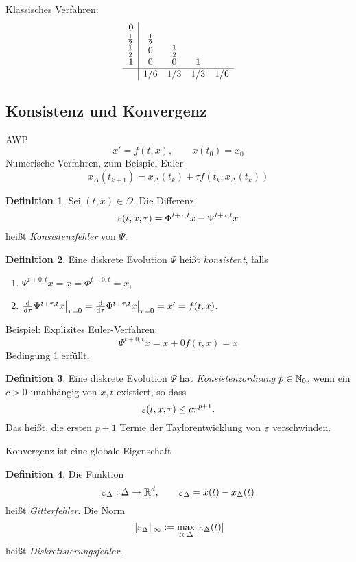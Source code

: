 \documentclass[
 a4paper,
 12pt,
 parskip=half
 ]{scrreprt}
\theoremstyle{plain}
\theoremstyle{definition}
\numberwithin{rmrk}{chapter}
\numberwithin{defn}{chapter}
\numberwithin{exmp}{chapter}
\numberwithin{prgp}{subsection}
\newtheorem*{defn*}{Definition}
\numberwithin{equation}{chapter}
\begin{document}
Klassisches Verfahren:
\[
  \begin{array}{r|cccc}
    0 \\
    \frac{1}{2} & \frac{1}{2} \\
    \frac{1}{2} & 0 & \frac{1}{2} \\
    1 & 0 & 0 & 1 \\
    \hline
    & 1/6 & 1/3 & 1/3 & 1/6
  \end{array}
\]

\subsection{Konsistenz und Konvergenz}
AWP 
\[ x' = f(t,x), \qquad x(t_0) = x_0 \]
Numerische  Verfahren, zum Beispiel Euler
\[ x_\Delta(t_{k+1}) = x_\Delta(t_k) + \tau f(t_k, x_\Delta(t_k)) \]

\begin{defn*}
  Sei $(t,x) \in \Omega$. Die Differenz
  \[ \varepsilon(t,x,\tau) = \Phi^{t+\tau,t} x - \Psi^{t+\tau,t}x\]
  heißt \emph{Konsistenzfehler} von $\Psi$.
\end{defn*}

\begin{defn*}
  Eine diskrete Evolution $\Psi$ heißt \emph{konsistent}, falls
  \begin{enumerate}
  \item $\Psi^{t+0,t} x = x = \Phi^{t+0,t} = x$,
  \item $\frac{\mathrm{d} }{\mathrm{d} \tau} \Psi^{t+\tau,t} x \big|_{\tau=0} = \frac{\mathrm{d} }{\mathrm{d} \tau}
    \Phi^{t+\tau,t} x \big|_{\tau=0} = x' = f(t,x)$.
  \end{enumerate}
\end{defn*}
Beispiel: Explizites Euler-Verfahren:
\[ \Psi^{t+0,t} x = x + 0 f(t,x) = x \]
Bedingung 1 erfüllt.

\begin{defn*}
  Eine diskrete Evolution $\Psi$ hat \emph{Konsistenzordnung} $p \in \mathbb{N}_0$,
  wenn ein $c > 0$ unabhängig von $x,t$ existiert, so dass
  \[ \varepsilon(t,x,\tau) \le c \tau^{p+1}. \]
  Das heißt, die ersten $p+1$ Terme der Taylorentwicklung von $\varepsilon$
  verschwinden.
\end{defn*}

Konvergenz ist eine globale Eigenschaft
\begin{defn*}
  Die Funktion
  \[ \varepsilon_\Delta : \Delta \to \mathbb{R}^d, \qquad \varepsilon_\Delta = x(t) -
    x_\Delta(t) \]
  heißt \emph{Gitterfehler}. Die Norm
  \[ \| \varepsilon_\Delta \|_\infty := \max_{t \in \Delta} |\varepsilon_\Delta(t)| \]
  heißt \emph{Diskretisierungsfehler}.
\end{defn*}
\end{document}
